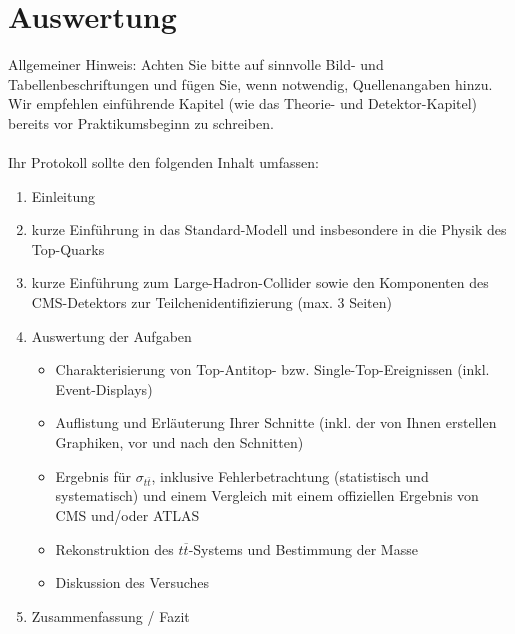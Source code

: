 \section{Auswertung}
\label{prot}
Allgemeiner Hinweis: Achten Sie bitte auf sinnvolle Bild- und Tabellenbeschriftungen und f\"ugen Sie, wenn notwendig, Quellenangaben hinzu. Wir empfehlen einf\"uhrende Kapitel (wie das Theorie- und Detektor-Kapitel) bereits vor Praktikumsbeginn zu schreiben.\\
\\
Ihr Protokoll sollte den folgenden Inhalt umfassen:
\begin{enumerate}
	\item Einleitung
	\item kurze Einf\"uhrung in das Standard-Modell und insbesondere in die Physik des Top-Quarks
	\item kurze Einf\"uhrung zum Large-Hadron-Collider sowie den Komponenten des CMS-Detektors zur Teilchenidentifizierung (max. 3 Seiten)
	\item Auswertung der Aufgaben
	\begin{itemize}
		\item Charakterisierung von Top-Antitop- bzw. Single-Top-Ereignissen (inkl. Event-Displays)
		\item Auflistung und Erl\"auterung Ihrer Schnitte (inkl. der von Ihnen erstellen Graphiken, vor und nach den Schnitten)
		\item Ergebnis f\"ur $\sigma_{t\bar{t}}$, inklusive Fehlerbetrachtung (statistisch und systematisch) und einem Vergleich mit einem offiziellen Ergebnis von CMS und/oder ATLAS
                \item Rekonstruktion des $t\overline{t}$-Systems und Bestimmung der Masse
                \item Diskussion des Versuches 
       \end{itemize}
	\item Zusammenfassung / Fazit
\end{enumerate}